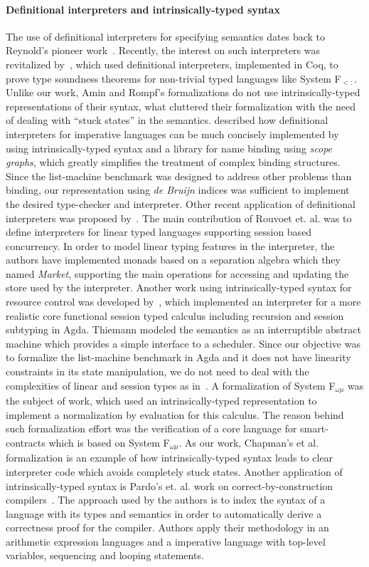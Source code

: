 \documentclass[review]{elsarticle}
\theoremstyle{definition}
\begin{document}
\paragraph{Definitional interpreters and intrinsically-typed syntax}{
The use of definitional interpreters for specifying semantics dates back to Reynold's pioneer work~\cite{Reynolds72}.
Recently, the interest on such interpreters was revitalized by~\cite{Amin17}, which used definitional
interpreters, implemented in Coq, to prove type soundness theorems for non-trivial typed languages like System F$_{<:}$.
Unlike our work, Amin and Rompf's formalizations do not use intrinsically-typed representations of their syntax, what cluttered
their formalization with the need of dealing with ``stuck states'' in the semantics. \cite{Poulsen18} described how
definitional interpreters for imperative languages can be much concisely implemented by using intrinsically-typed syntax and a
library for name binding using \emph{scope graphs}, which greatly simplifies the treatment of complex
binding structures. Since the list-machine benchmark was designed to address other problems than binding, our representation
using \emph{de Bruijn} indices was sufficient to implement the desired type-checker and interpreter.
Other recent application of definitional interpreters was proposed by~\cite{Rouvoet20}. The main contribution
of Rouvoet et. al. was to define interpreters for linear typed languages supporting session based concurrency. In order to model
linear typing features in the interpreter, the authors have implemented monads based on a separation algebra which they
named \emph{Market}, supporting the main operations for accessing and updating the store used by the interpreter.
Another work using intrinsically-typed syntax for resource control was developed by~\cite{Thiemann19}, which
implemented an interpreter for a more realistic core functional session typed calculus including recursion and
session subtyping in Agda. Thiemann modeled the semantics as an interruptible abstract machine which provides a
simple interface to a scheduler. Since our objective was to formalize the list-machine benchmark in Agda and it
does not have linearity constraints in its state manipulation, we do not need to deal with the complexities
of linear and session types as in~\cite{Rouvoet20,Thiemann19}. A formalization of System F$_{\omega\mu}$ was
the subject of \cite{ChapmanKNW19} work, which used an intrinsically-typed representation to
implement a normalization by evaluation for this calculus. The reason behind such formalization effort was
the verification of a core language for smart-contracts which is based on System F$_{\omega\mu}$. As our work,
Chapman's et al. formalization is an example of how intrinsically-typed syntax leads to clear interpreter code
which avoids completely stuck states. Another application of intrinsically-typed syntax is Pardo's et. al. work on correct-by-construction
compilers~\cite{PardoGPV18}. The approach used by the authors is to index the syntax of
a language with its types and semantics in order to automatically derive a correctness proof for the
compiler. Authors apply their methodology in an arithmetic expression languages and a imperative
language with top-level variables, sequencing and looping statements. }
\end{document}
